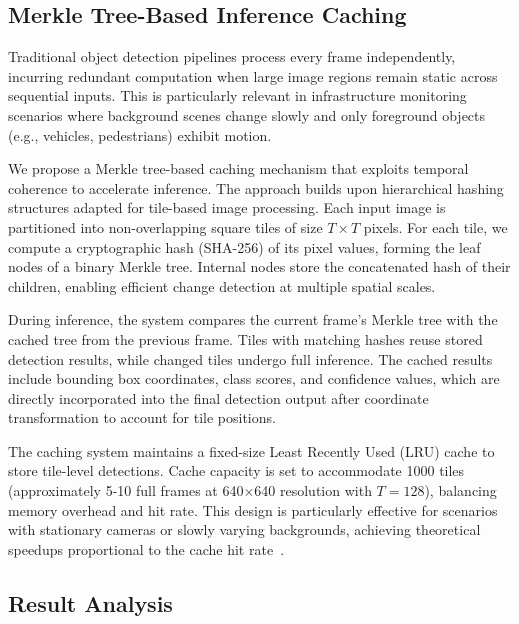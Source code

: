 \documentclass[runningheads]{llncs}
\begin{document}
\subsection{Merkle Tree-Based Inference Caching}
\label{sec:merkle_caching}

Traditional object detection pipelines process every frame independently, incurring redundant computation when large image regions remain static across sequential inputs. This is particularly relevant in infrastructure monitoring scenarios where background scenes change slowly and only foreground objects (e.g., vehicles, pedestrians) exhibit motion.

We propose a Merkle tree-based caching mechanism that exploits temporal coherence to accelerate inference. The approach builds upon hierarchical hashing structures
adapted for tile-based image processing. Each input image is partitioned into non-overlapping square tiles of size $T \times T$ pixels. For each tile, we compute a cryptographic hash (SHA-256) of its pixel values, forming the leaf nodes of a binary Merkle tree. Internal nodes store the concatenated hash of their children, enabling efficient change detection at multiple spatial scales.

During inference, the system compares the current frame's Merkle tree with the cached tree from the previous frame. Tiles with matching hashes reuse stored detection results, while changed tiles undergo full inference. The cached results include bounding box coordinates, class scores, and confidence values, which are directly incorporated into the final detection output after coordinate transformation to account for tile positions.

The caching system maintains a fixed-size Least Recently Used (LRU) cache to store tile-level detections. Cache capacity is set to accommodate 1000 tiles (approximately 5-10 full frames at 640$\times$640 resolution with $T=128$), balancing memory overhead and hit rate. This design is particularly effective for scenarios with stationary cameras or slowly varying backgrounds, achieving theoretical speedups proportional to the cache hit rate~\cite{shi2020pv}.



\subsection{Result Analysis}
\end{document}
